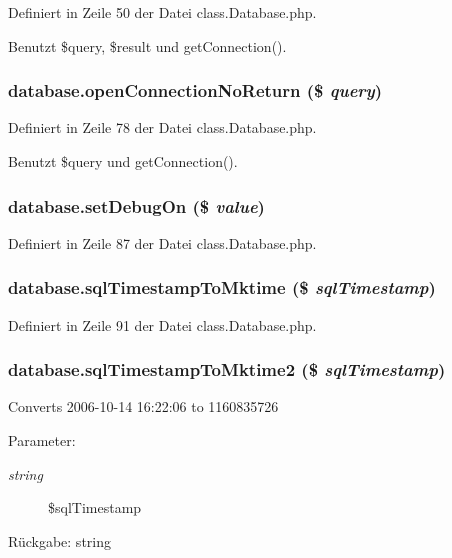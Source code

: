 Definiert in Zeile 50 der Datei class.Database.php.

Benutzt \$query, \$result und getConnection().
\subsubsection{\setlength{\rightskip}{0pt plus 5cm}database.openConnectionNoReturn (\$ {\em query})}\label{classdatabase_2b27672ff3443ac4ba2493abcdbdf9b9}




Definiert in Zeile 78 der Datei class.Database.php.

Benutzt \$query und getConnection().
\subsubsection{\setlength{\rightskip}{0pt plus 5cm}database.setDebugOn (\$ {\em value})}\label{classdatabase_d159ee27d8ae9d5ae5f81f47612cd4eb}




Definiert in Zeile 87 der Datei class.Database.php.
\subsubsection{\setlength{\rightskip}{0pt plus 5cm}database.sqlTimestampToMktime (\$ {\em sqlTimestamp})}\label{classdatabase_010de7b3b936a6be5141e30c79b5e758}




Definiert in Zeile 91 der Datei class.Database.php.
\subsubsection{\setlength{\rightskip}{0pt plus 5cm}database.sqlTimestampToMktime2 (\$ {\em sqlTimestamp})}\label{classdatabase_94edea2470e1b2d6c267a475fdc14fba}


Converts 2006-10-14 16:22:06 to 1160835726

\begin{Desc}
\item[Parameter:]
\begin{description}
\item[{\em string}]\$sqlTimestamp \end{description}
\end{Desc}
\begin{Desc}
\item[Rückgabe:]string \end{Desc}


